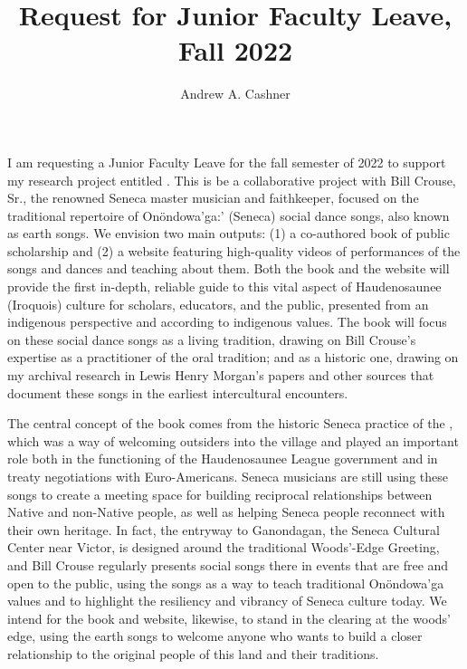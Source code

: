 \documentclass[12pt]{article}
\title{Request for Junior Faculty Leave, Fall 2022}
\author{Andrew A. Cashner}
\begin{document}
\maketitle

I am requesting a Junior Faculty Leave for the fall semester of 2022 to
support my research project entitled .
This is be a collaborative project with Bill Crouse, Sr., the renowned
Seneca master musician and faithkeeper, focused on the traditional repertoire
of Onöndowa'ga:' (Seneca) social dance songs, also known as earth songs.
We envision two main outputs: (1) a co-authored book of public scholarship and
(2) a website featuring high-quality videos of performances of the songs and
dances and teaching about them.
Both the book and the website will provide the first in-depth, reliable
guide to this vital aspect of Haudenosaunee (Iroquois) culture for scholars,
educators, and the public, presented from an indigenous perspective and
according to indigenous values.  
The book will focus on these social dance songs as a living tradition, drawing
on Bill Crouse’s expertise as a practitioner of the oral tradition; and as a
historic one, drawing on my archival research in Lewis Henry Morgan’s papers
and other sources that document these songs in the earliest intercultural
encounters. 

The central concept of the book comes from the historic Seneca practice of the
, which was a way of welcoming outsiders into the
village and played an important role both in the functioning of the
Haudenosaunee League government and in treaty negotiations with
Euro-Americans.%
\Autocite{Richter:Ordeal}
Seneca musicians are still using these songs to create a meeting space for
building reciprocal relationships between Native and non-Native people, as
well as helping Seneca people reconnect with their own heritage.
In fact, the entryway to Ganondagan, the Seneca Cultural Center near Victor,
is designed around the traditional Woods'-Edge Greeting, and Bill Crouse
regularly presents social songs there in events that are free and open to the
public, using the songs as a way to teach traditional Onöndowa'ga values and
to highlight the resiliency and vibrancy of Seneca culture today.
We intend for the book and website, likewise, to stand in the clearing at the
woods' edge, using the earth songs to welcome anyone who wants to build a
closer relationship to the original people of this land and their traditions.
\end{document}
